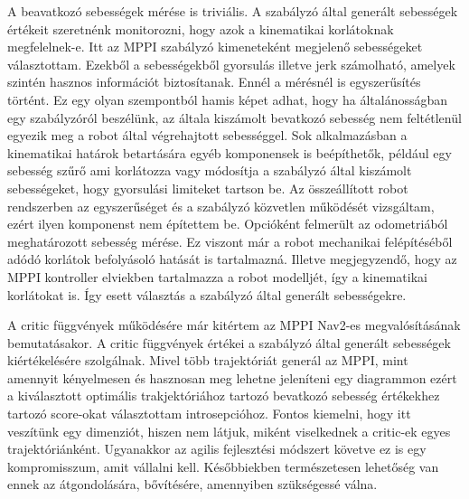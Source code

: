 A beavatkozó sebességek mérése is triviális. A szabályzó által generált sebességek értékeit szeretnénk monitorozni, hogy azok a kinematikai korlátoknak megfelelnek-e. Itt az MPPI szabályzó kimeneteként megjelenő sebességeket választottam. Ezekből a sebességekből gyorsulás illetve jerk számolható, amelyek szintén hasznos információt biztosítanak. Ennél a mérésnél is egyszerűsítés történt. Ez egy olyan szempontból hamis képet adhat, hogy ha általánosságban egy szabályzóról beszélünk, az általa kiszámolt bevatkozó sebesség nem feltétlenül egyezik meg a robot által végrehajtott sebességgel. Sok alkalmazásban a kinematikai határok betartására egyéb komponensek is beépíthetők, például egy sebesség szűrő ami korlátozza vagy módosítja a szabályzó által kiszámolt sebességeket, hogy gyorsulási limiteket tartson be. Az összeállított robot rendszerben az egyszerűséget és a szabályzó közvetlen működését vizsgáltam, ezért ilyen komponenst nem építettem be. Opcióként felmerült az odometriából meghatározott sebesség mérése. Ez viszont már a robot mechanikai felépítéséből adódó korlátok befolyásoló hatását is tartalmazná. Illetve megjegyzendő, hogy az MPPI kontroller elviekben tartalmazza a robot modelljét, így a kinematikai korlátokat is. Így esett választás a szabályzó által generált sebességekre.

A critic függvények működésére már kitértem az MPPI Nav2-es megvalósításának bemutatásakor. A critic függvények értékei a szabályzó által generált sebességek kiértékelésére szolgálnak. Mivel több trajektóriát generál az MPPI, mint amennyit kényelmesen és hasznosan meg lehetne jeleníteni egy diagrammon ezért a kiválasztott optimális trakjektóriához tartozó bevatkozó sebesség értékekhez tartozó score-okat választottam introsepcióhoz. Fontos kiemelni, hogy itt veszítünk egy dimenziót, hiszen nem látjuk, miként viselkednek a critic-ek egyes trajektóriánként. Ugyanakkor az agilis fejlesztési módszert követve ez is egy kompromisszum, amit vállalni kell. Későbbiekben természetesen lehetőség van ennek az átgondolására, bővítésére, amennyiben szükségessé válna.

